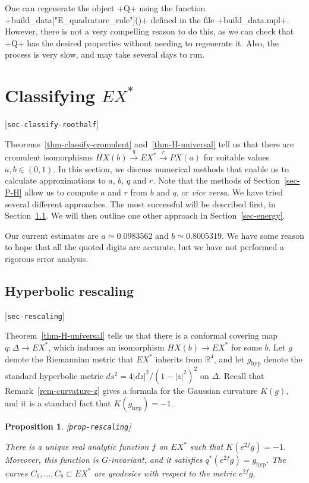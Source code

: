\documentclass[reqno]{amsart}
\newcommand{\lbl}[1]{\label{#1}\textup{[\texttt{#1}]}\par}
\newcommand{\lbl}{\label}
\newcommand{\hyp}	{\operatorname{hyp}}
\newcommand{\Dl}        {\Delta}
\newcommand{\xra}       {\xrightarrow}
\newcommand{\R}         {{\mathbb{R}}}
\renewcommand{\:}{\colon}
\newtheorem{proposition}[theorem]{Proposition}
\theoremstyle{definition}
\begin{document}
One can regenerate the object \mcode+Q+ using the function
\mcode+build_data["E_quadrature_rule"]()+ defined in the file
\fname+build_data.mpl+.  However, there is not a very compelling
reason to do this, as we can check that \mcode+Q+ has the desired
properties without needing to regenerate it.  Also, the process is
very slow, and may take several days to run. 

\section{Classifying \texorpdfstring{$EX^*$}{EX*}}
\lbl{sec-classify-roothalf}

Theorems~\ref{thm-classify-cromulent} and~\ref{thm-H-universal} tell
us that there are cromulent isomorphisms
$HX(b)\xra{q}EX^*\xra{r}PX(a)$ for suitable values $a,b\in(0,1)$.
In this section, we discuss numerical methods that enable us to
calculate approximations to $a$, $b$, $q$ and $r$.  Note that the
methods of Section~\ref{sec-P-H} allow us to compute $a$ and $r$ from
$b$ and $q$, or \emph{vice versa}.  We have tried several different
approaches.  The most successful will be described first, in
Section~\ref{sec-rescaling}.  We will then outline one other approach
in Section~\ref{sec-energy}.

Our current estimates are $a\simeq 0.0983562$ and $b\simeq 0.8005319$.
We have some reason to hope that all the quoted digits are accurate,
but we have not performed a rigorous error analysis.

\subsection{Hyperbolic rescaling}
\lbl{sec-rescaling}

Theorem~\ref{thm-H-universal} tells us that there is a conformal
covering map $q\:\Dl\to EX^*$, which induces an isomorphism
$HX(b)\to EX^*$ for some $b$.  Let $g$ denote the Riemannian metric
that $EX^*$ inherits from $\R^4$, and let $g_{\hyp}$ denote the
standard hyperbolic metric $ds^2=4|dz|^2/(1-|z|^2)^2$ on $\Dl$.  Recall
that Remark~\ref{rem-curvature-z} gives a formula for the Gaussian
curvature $K(g)$, and it is a standard fact that
$K(g_{\hyp})=-1$.

\begin{proposition}\lbl{prop-rescaling}
 There is a unique real analytic function $f$ on $EX^*$ such that
 $K(e^{2f}g)=-1$.  Moreover, this function is $G$-invariant, and it
 satisfies $q^*(e^{2f}g)=g_{\hyp}$.  The curves
 $C_0,\dotsc,C_8\subset EX^*$ are geodesics with respect to the metric
 $e^{2f}g$.
\end{proposition}
\end{document}
